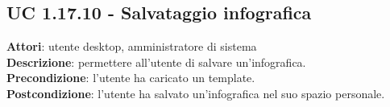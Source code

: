 \subsection{UC 1.17.10 - Salvataggio infografica}{
	\label{uc1.17.10}
	\textbf{Attori}: utente desktop, amministratore di sistema \\
	\textbf{Descrizione}: permettere all’utente di salvare un’infografica. \\
	\textbf{Precondizione}: l'utente ha caricato un template.	\\
	\textbf{Postcondizione}: l'utente ha salvato un’infografica nel suo spazio personale.	\\
	}